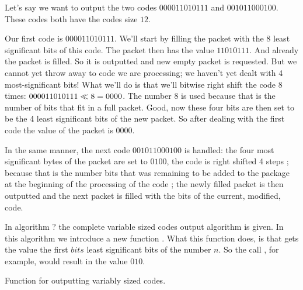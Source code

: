\begin{refsection}
Let's say we want to output the two codes $0000 1101 0111$ and $0010
1100 0100$. These codes both have the codes size $12$.

Our first code is $0000 1101 0111$. We'll start by filling the packet
with the 8 least significant bits of this code. The packet then has
the value $1101 0111$. And already the packet is filled. So it is
outputted and new empty packet is requested. But we cannot yet throw
away to code we are processing; we haven't yet dealt with 4
most-significant bits! What we'll do is that we'll bitwise right shift
the code 8 times: $0000 1101 0111 \ll 8 = 0000$. The number $8$ is used
because that is the number of bits that fit in a full packet. Good,
now these four bits are then set to be the 4 least significant bits of
the new packet. So after dealing with the first code the value of the
packet is $0000$.

In the same manner, the next code $0010 1100 0100$ is handled: the
four most significant bytes of the packet are set to $0100$, the code
is right shifted 4 steps ; because that is the number bits that was
remaining to be added to the package at the beginning of the
processing of the code ; the newly filled packet is then outputted and
the next packet is filled with the bits of the current, modified,
code.

In algorithm ? the complete variable sized codes output algorithm is
given. In this algorithm we introduce a new function
. What this function
does, is that gets the value the first $bits$ least significant bits
of the number $n$. So the call , for
example, would result in the value $010$.

\begin{algorithm}[H]
  \caption{Function for outputting variably sized codes.}
  \label{alg:variable-codes-output}
  \begin{algorithmic}[1]




       


\end{algorithmic}
\end{algorithm}
\end{refsection}
